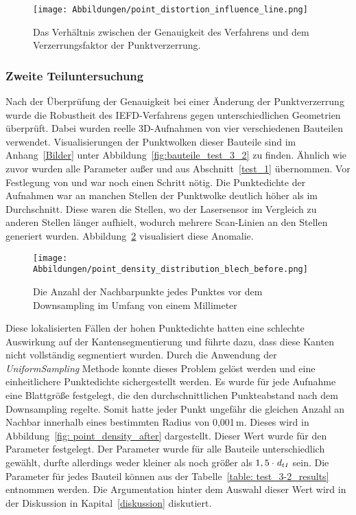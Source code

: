 \begin{figure}[h]
	\texttt{[image: Abbildungen/point\_distortion\_influence\_line.png]}
	\centering
	\caption[Einfluss des Rauschens auf die Genauigkeit]{Das Verhältnis zwischen der Genauigkeit des Verfahrens und dem Verzerrungsfaktor der Punktverzerrung.}
	\label{fig: point_distortion_comparision}
\end{figure}

\subsubsection{Zweite Teiluntersuchung} \label{test_3_part_2}
Nach der Überprüfung der Genauigkeit bei einer Änderung der Punktverzerrung wurde die Robustheit des IEFD-Verfahrens gegen unterschiedlichen Geometrien überprüft. Dabei wurden reelle 3D-Aufnahmen von vier verschiedenen Bauteilen verwendet. Visualisierungen der Punktwolken dieser Bauteile sind im Anhang~\ref{Bilder} unter Abbildung~\ref{fig:bauteile_test_3_2} zu finden. Ähnlich wie zuvor wurden alle Parameter außer \distthresha und \distthreshb aus Abschnitt~\ref{test_1} übernommen. Vor Festlegung von \distthresha und \distthreshb war noch einen Schritt nötig. Die Punktedichte der Aufnahmen war an manchen Stellen der Punktwolke deutlich höher als im Durchschnitt. Diese waren die Stellen, wo der Lasersensor im Vergleich zu anderen Stellen länger aufhielt, wodurch mehrere Scan-Linien an den Stellen generiert wurden. Abbildung~\ref{fig: point_density_before} visualisiert diese Anomalie. 

\begin{figure}[t]
\texttt{[image: Abbildungen/point\_density\_distribution\_blech\_before.png]}
\centering
\caption[Verteilung der Punktedichte vor dem Downsampling]{Die Anzahl der Nachbarpunkte jedes Punktes vor dem Downsampling im Umfang von einem Millimeter}
\label{fig: point_density_before}
\end{figure}

Diese lokalisierten Fällen der hohen Punktedichte hatten eine schlechte Auswirkung auf der Kantensegmentierung und führte dazu, dass diese Kanten nicht vollständig segmentiert wurden. Durch die Anwendung der \textit{UniformSampling} Methode konnte dieses Problem gelöst werden und eine einheitlichere Punktedichte sichergestellt werden. Es wurde für jede Aufnahme eine Blattgröße festgelegt, die den durchschnittlichen Punkteabstand nach dem Downsampling regelte. Somit hatte jeder Punkt ungefähr die gleichen Anzahl an Nachbar innerhalb eines bestimmten Radius von 0,001\,\si{\m}. Dieses wird in Abbildung~\ref{fig: point_density_after} dargestellt. Dieser Wert wurde für den Parameter \distthresha festgelegt. Der Parameter \distthreshb wurde für alle Bauteile unterschiedlich gewählt, durfte allerdings weder kleiner als \distthresha noch größer als $1,5 \cdot \textit{d\textsubscript{t1}}$ sein. Die Parameter für jedes Bauteil können aus der Tabelle~\ref{table: test_3-2_results} entnommen werden. Die Argumentation hinter dem Auswahl dieser Wert wird in der Diskussion in Kapital~\ref{diskussion} diskutiert.

